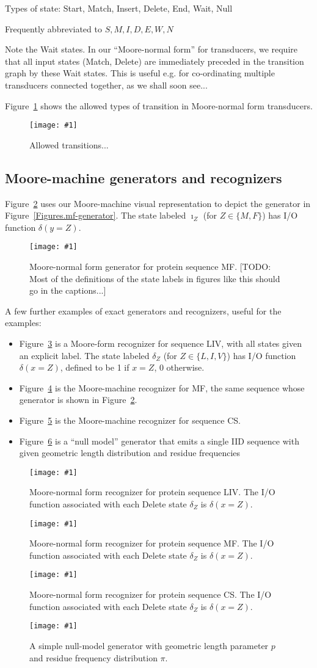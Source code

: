 \documentclass{article}
\newcommand{\figref}[1]{Figure~\ref{Figures.#1}}
\newcommand{\figlabel}[1]{\label{Figures.#1}}
\newcommand{\todo}[1]{[TODO: #1]}
\newcommand{\easyfig}[4]{
\begin{figure}
\texttt{[image: \#1]}
\caption{ \figlabel{#3} #4}
\end{figure}}
\newcommand{\pdffig}[2]{\easyfig{#1-fig.pdf}{}{#1}{#2}}
\newcommand{\tallpdffig}[2]{\easyfig{#1-fig.pdf}{height=\textheight}{#1}{#2}}
\begin{document}
Types of state: Start, Match, Insert, Delete, End, Wait, Null

Frequently abbreviated to $S,M,I,D,E,W,N$

Note the Wait states.
In our ``Moore-normal form'' for transducers, we require that all input states (Match, Delete)
are immediately preceded in the transition graph by these Wait states.
This is useful e.g. for co-ordinating multiple transducers connected together, as we shall soon see...

\figref{transitions} shows the allowed types of transition in Moore-normal form transducers.
\pdffig{transitions}{Allowed transitions...}


\subsection{Moore-machine generators and recognizers}

\figref{moore-mf-generator} uses our Moore-machine visual representation
to depict the generator in \figref{mf-generator}.
The state labeled $\imath_Z$ (for $Z \in \{M,F\}$) has I/O function $\delta(y=Z)$.

\pdffig{moore-mf-generator}{Moore-normal form generator for protein sequence MF.
\todo{Most of the definitions of the state labels in figures like this should go in the captions...} }

A few further examples of exact generators and recognizers, useful for the examples:
\begin{itemize}
\item \figref{liv-labeled} is a Moore-form recognizer for sequence LIV, with all states given an explicit label.
The state labeled $\delta_Z$  (for $Z \in \{L,I,V\}$) has I/O function $\delta(x=Z)$,
defined to be 1 if $x=Z$, 0 otherwise.
\item \figref{mf-labeled} is the Moore-machine recognizer for MF,
the same sequence whose generator is shown in \figref{moore-mf-generator}.
\item \figref{cs-labeled} is the Moore-machine recognizer for sequence CS.
\item \figref{null-model} is a ``null model'' generator that emits a single IID sequence
with given geometric length distribution and residue frequencies
\end{itemize}

\tallpdffig{liv-labeled}{Moore-normal form recognizer for protein sequence LIV.
The I/O function associated with each Delete state $\delta_Z$ is $\delta(x=Z)$.}
\pdffig{mf-labeled}{Moore-normal form recognizer for protein sequence MF.
The I/O function associated with each Delete state $\delta_Z$ is $\delta(x=Z)$.}
\pdffig{cs-labeled}{Moore-normal form recognizer for protein sequence CS.
The I/O function associated with each Delete state $\delta_Z$ is $\delta(x=Z)$.}
\pdffig{null-model}{A simple null-model generator with geometric length parameter $p$ and residue frequency distribution $\pi$.}
\end{document}
